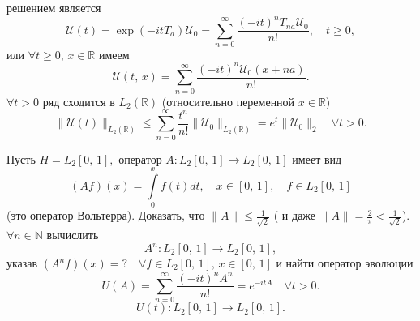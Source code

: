 \documentclass[a4paper]{article}
\begin{document}
 решением является
 \[
	 \mathcal{U}(t)= \exp \left( -i t T_a \right) \mathcal{U}_0=
	 \sum_{n=0}^{\infty} \frac{(-it)^nT_{na}\mathcal{U}_0}{n!},
	 \quad t\ge 0
  ,\]
  или $\forall t \ge 0,\, x \in \mathbb{R}$ имеем
  \[
	  \mathcal{U}(t,\,x)= \sum_{n=0}^{\infty} \frac{(-it)^n
	  \mathcal{U}_0(x+na)}{n!}
  .\] 
  $\forall t > 0$ ряд сходится в $L_2(\mathbb{R})$ (относительно
  переменной $x \in \mathbb{R}$)
  \[
	  \| \mathcal{U}(t)\|_{L_2 (\mathbb{R})}\le 
	  \sum_{n=0}^{\infty} \frac{t^n}{n!}\| \mathcal{U}_0\|_{L_2(\mathbb{R})}=e^t \| \mathcal{U}_0\|_2 \quad \forall t >0
  .\] 
\begin{problem*}
	Пусть $H=L_2[0,\,1],$ оператор  $A: L_2 [0,\,1]\to L_2[0,\,1]$ имеет вид
	\[
		(Af)(x) = \int\limits_{0}^{x} f(t) dt,\quad
		x \in [0,\,1],\quad f \in L_2[0,\,1]
	\]
	(это оператор Вольтерра).
	Доказать, что $\| A\|\le \frac{1}{\sqrt{2} }$ ( и даже
	$\| A\|= \frac{2}{\pi}<\frac{1}{\sqrt{2} }$). 
	$\forall n \in \mathbb{N}$ вычислить
	\[
		A^n: L_2 [0,\,1]\to L_2[0,\,1],
	\]
	указав $(A^n f)(x)=? \quad \forall f \in L_2 [0,\,1],\,
	x \in [0,\,1]$ и найти оператор эволюции
	\[
		U(A)= \sum_{n=0}^{\infty} \frac{(-it)^nA^n}{n!}=
		e ^{-i t A} \quad \forall t >0
	.\]
	\[
		U(t) : L_2[0,\,1]\to L_2 [0,\,1]
	.\] 
\end{problem*}
\end{document}
